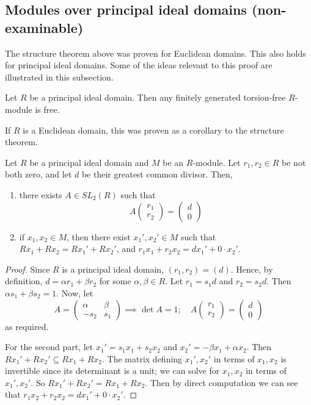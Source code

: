 \subsection{Modules over principal ideal domains (non-examinable)}
The structure theorem above was proven for Euclidean domains.
This also holds for principal ideal domains.
Some of the ideas relevant to this proof are illustrated in this subsection.
\begin{theorem}
	Let \( R \) be a principal ideal domain.
	Then any finitely generated torsion-free \( R \)-module is free.
\end{theorem}
If \( R \) is a Euclidean domain, this was proven as a corollary to the structure theorem.
\begin{lemma}
	Let \( R \) be a principal ideal domain and \( M \) be an \( R \)-module.
	Let \( r_1, r_2 \in R \) be not both zero, and let \( d \) be their greatest common divisor.
	Then,
	\begin{enumerate}
		\item there exists \( A \in SL_2(R) \) such that
		      \[
			      A \begin{pmatrix}
				      r_1 \\
				      r_2
			      \end{pmatrix} = \begin{pmatrix}
				      d \\
				      0
			      \end{pmatrix}
		      \]
		\item if \( x_1, x_2 \in M \), then there exist \( x_1', x_2' \in M \) such that \( Rx_1 + Rx_2 = Rx_1' + Rx_2' \), and \( r_1 x_1 + r_2 x_2  = d x_1' + 0 \cdot x_2' \).
	\end{enumerate}
\end{lemma}
\begin{proof}
	Since \( R \) is a principal ideal domain, \( (r_1, r_2) = (d) \).
	Hence, by definition, \( d = \alpha r_1 + \beta r_2 \) for some \( \alpha, \beta \in R \).
	Let \( r_1 = s_1 d \) and \( r_2 = s_2 d \).
	Then \( \alpha s_1 + \beta s_2 = 1 \).
	Now, let
	\[
		A = \begin{pmatrix}
			\alpha & \beta \\
			-s_2   & s_1
		\end{pmatrix} \implies \det A = 1;\quad A \begin{pmatrix}
			r_1 \\
			r_2
		\end{pmatrix} = \begin{pmatrix}
			d \\
			0
		\end{pmatrix}
	\]
	as required.

	For the second part, let \( x_1' = s_1 x_1 + s_2 x_2 \) and \( x_2' = -\beta x_1 + \alpha x_2 \).
	Then \( Rx_1' + Rx_2' \subseteq Rx_1 + Rx_2 \).
	The matrix defining \( x_1', x_2' \) in terms of \( x_1, x_2 \) is invertible since its determinant is a unit; we can solve for \( x_1, x_2 \) in terms of \( x_1', x_2' \).
	So \( Rx_1' + Rx_2' = Rx_1 + Rx_2 \).
	Then by direct computation we can see that \( r_1 x_2 + r_2 x_2 = d x_1' + 0 \cdot x_2' \).
\end{proof}
